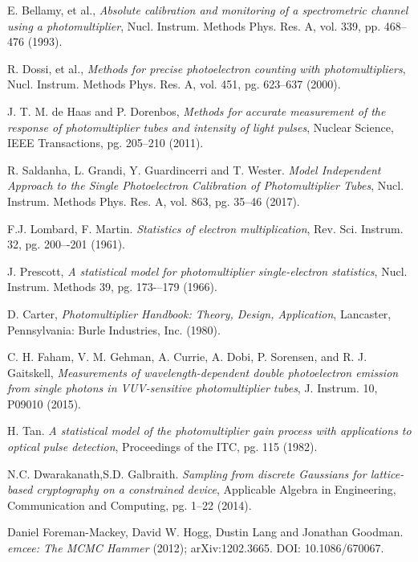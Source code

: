 \documentclass[11pt,a4paper]{article}
\begin{document}
\begin{thebibliography}{24}

E. Bellamy, et al., \textit{Absolute calibration and monitoring of a spectrometric channel using a photomultiplier}, Nucl. Instrum. Methods Phys. Res. A, vol. 339, pp. 468--476 (1993).

R. Dossi, et al., \textit{Methods for precise
photoelectron counting with photomultipliers}, Nucl. Instrum. Methods Phys. Res. A, vol. 451, pg. 623--637 (2000).

 J. T. M. de Haas and P. Dorenbos, \textit{Methods for accurate measurement of the response of photomultiplier tubes and intensity of light pulses}, Nuclear Science, IEEE Transactions, pg. 205--210 (2011).

R. Saldanha, L. Grandi, Y. Guardincerri and T. Wester.  \textit{Model Independent Approach to the Single Photoelectron Calibration of Photomultiplier Tubes}, Nucl. Instrum. Methods Phys. Res. A, vol. 863, pg. 35--46 (2017).

F.J. Lombard, F. Martin. \textit{Statistics of electron multiplication}, Rev. Sci. Instrum. 32, pg. 200–-201 (1961).

J. Prescott, \textit{A statistical model for photomultiplier single-electron statistics}, Nucl. Instrum. Methods 39, pg. 173-–179 (1966).



D. Carter, \textit{Photomultiplier Handbook: Theory, Design, Application}, Lancaster, Pennsylvania: Burle Industries, Inc. (1980).

C. H. Faham, V. M. Gehman, A. Currie, A. Dobi, P.
Sorensen, and R. J. Gaitskell, \textit{Measurements of wavelength-dependent
double photoelectron emission from
single photons in VUV-sensitive photomultiplier tubes},
J. Instrum. 10, P09010 (2015).

H. Tan. \textit{A statistical model of the photomultiplier gain process with applications to optical pulse detection}, Proceedings of the ITC, pg. 115 (1982).

N.C. Dwarakanath,S.D. Galbraith. \textit{Sampling from discrete Gaussians for lattice-based cryptography on a constrained device}, Applicable Algebra in Engineering, Communication and Computing, pg. 1--22 (2014).

Daniel Foreman-Mackey, David W. Hogg, Dustin Lang and Jonathan Goodman.
\newblock \textit{emcee: The MCMC Hammer} (2012);
\newblock arXiv:1202.3665.
\newblock DOI: 10.1086/670067.


\end{thebibliography}
\end{document}
